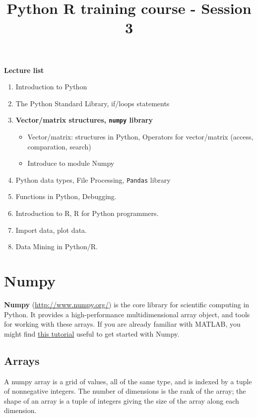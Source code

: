 \documentclass[11pt]{article}
\title{Python R training course - Session 3}
\providecommand{\tightlist}{%
      \setlength{\itemsep}{0pt}\setlength{\parskip}{0pt}}
\begin{document}
    
    
    \maketitle
    
    

    
    \textbf{Lecture list}

\begin{enumerate}
\def\labelenumi{\arabic{enumi}.}
\item
  Introduction to Python
\item
  The Python Standard Library, if/loops statements
\item
  \textbf{Vector/matrix structures, \texttt{numpy} library}

  \begin{itemize}
  \tightlist
  \item
    Vector/matrix: structures in Python, Operators for vector/matrix
    (access, comparation, search)
  \item
    Introduce to module Numpy
  \end{itemize}
\item
  Python data types, File Processing, \texttt{Pandas} library
\item
  Functions in Python, Debugging.
\item
  Introduction to R, R for Python programmers.
\item
  Import data, plot data.
\item
  Data Mining in Python/R.
\end{enumerate}

    \section{Numpy}\label{numpy}

\textbf{Numpy} (\url{http://www.numpy.org/}) is the core library for
scientific computing in Python. It provides a high-performance
multidimensional array object, and tools for working with these arrays.
If you are already familiar with MATLAB, you might find
\href{http://wiki.scipy.org/NumPy_for_Matlab_Users}{this tutorial}
useful to get started with Numpy.

    \subsection{Arrays}\label{arrays}

A numpy array is a grid of values, all of the same type, and is indexed
by a tuple of nonnegative integers. The number of dimensions is the rank
of the array; the shape of an array is a tuple of integers giving the
size of the array along each dimension.
\end{document}
